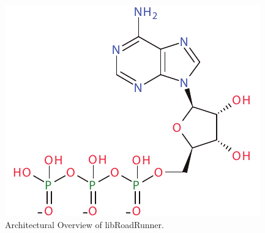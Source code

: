 \documentclass{bioinfo}
\begin{document}
\begin{figure}[!htpb]%
\centerline{\includegraphics[scale=0.7]{atp.pdf}}
\caption{Architectural Overview of libRoadRunner.}\label{fig:01}
\end{figure}
\end{document}
